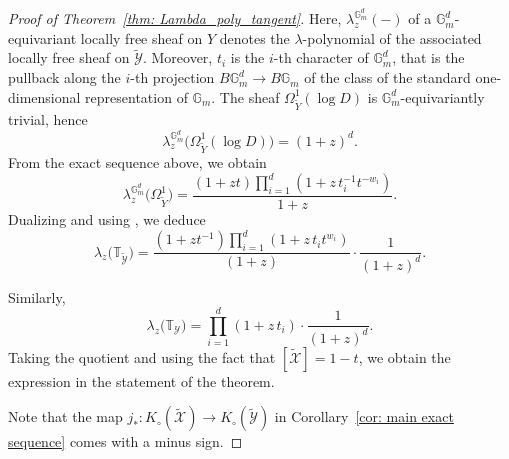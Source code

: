 \documentclass[12pt]{amsart}
\newcommand\Gm{\mathbb{G}_m}
\newcommand{\bT}{\mathbb{T}}
\newcommand{\cX}{\mathcal{X}}
\newcommand{\cY}{\mathcal{Y}}
\newcommand{\Kgroup}{K_{\circ}}
\theoremstyle{definition}
\begin{document}
\begin{proof}[Proof of Theorem~\ref{thm: Lambda_poly_tangent}]
Here, $\lambda_z^{\Gm^d}(-)$ of a $\Gm^d$-equivariant locally free sheaf on $Y$ denotes the $\lambda$-polynomial of the associated locally free sheaf on $\widetilde{\cY}$. Moreover, $t_i$ is the $i$-th character of $\Gm^d$, that is the pullback along the $i$-th projection $B\Gm^d \to B\mathbb{G}_m$ of the class of the standard one-dimensional representation of $\mathbb{G}_m$. The sheaf $\Omega_{\widetilde{Y}}^1(\log D)$ is $\Gm^d$-equivariantly trivial, hence
\[
\lambda_z^{\Gm^d}\!\bigl(\Omega_{\widetilde{Y}}^1(\log D)\bigr) = (1+z)^d.
\]
From the exact sequence above, we obtain
\[
\lambda_z^{\Gm^d}\!\bigl(\Omega_{\widetilde{Y}}^1\bigr)
= \frac{(1+zt)\prod_{i=1}^d (1+z\, t_i^{-1} t^{-w_i})}{1+z}.
\]
Dualizing and using , we deduce
\[
\lambda_z\!\bigl(\bT_{\widetilde{\cY}}\bigr)
= \frac{(1+zt^{-1})\prod_{i=1}^d (1+z\, t_i t^{w_i})}{(1+z)}\cdot\frac{1}{(1+z)^d}.
\]

Similarly,
\[
\lambda_z\!\bigl(\bT_{\cY}\bigr)
= \prod_{i=1}^d (1+z\, t_i)\cdot\frac{1}{(1+z)^d}.
\]
Taking the quotient and using the fact that $[\widetilde{\cX}]=1-t$, we obtain the expression in the statement of the theorem.

Note that the map $j_*: \Kgroup(\widetilde{\cX}) \to \Kgroup(\widetilde{\cY}) $ in Corollary~\ref{cor: main exact sequence} comes with a minus sign.
\end{proof}



\end{document}
